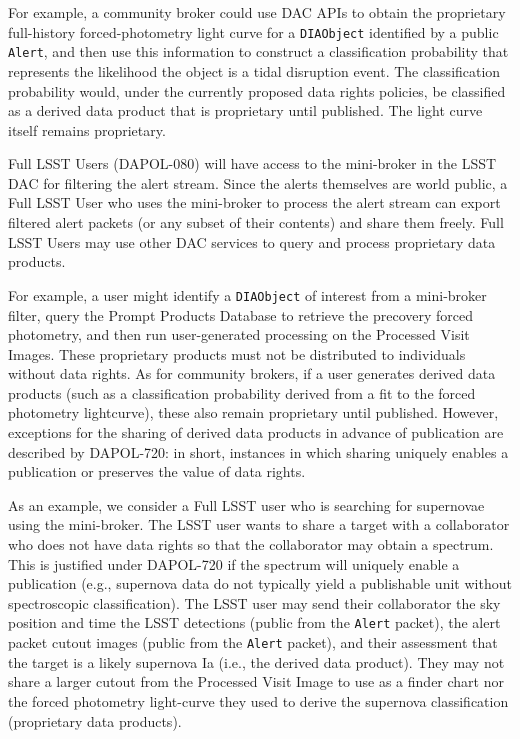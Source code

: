 For example, a community broker could use DAC APIs to obtain the proprietary full-history forced-photometry light curve for a \texttt{DIAObject} identified by a public {\tt Alert}, 
and then use this information to construct a classification probability that represents the likelihood the object is a tidal disruption event.
The classification probability would, under the currently proposed data rights policies, be classified as a derived data product that is proprietary until published. The light curve itself remains proprietary.

Full LSST Users (DAPOL-080) will have access to the mini-broker in the LSST DAC for filtering the alert stream.
Since the alerts themselves are world public, a Full LSST User who uses the mini-broker to process the alert stream can export filtered alert packets (or any subset of their contents) and share them freely.
Full LSST Users may use other DAC services to query and process proprietary data products.

For example, a user might identify a \texttt{DIAObject} of interest from a mini-broker filter, query the Prompt Products Database to retrieve the precovery forced photometry, and then run user-generated processing on the Processed Visit Images.
These proprietary products must not be distributed to individuals without data rights.
As for community brokers, if a user generates derived data products (such as a classification probability derived from a fit to the forced photometry lightcurve), these also remain proprietary until published.
However, exceptions for the sharing of derived data products in advance of publication are described by DAPOL-720: in short, instances in which sharing uniquely enables a publication or preserves the value of data rights.

As an example, we consider a Full LSST user who is searching for supernovae using the mini-broker.
The LSST user wants to share a target with a collaborator who does not have data rights so that the collaborator may obtain a spectrum.
This is justified under DAPOL-720 if the spectrum will uniquely enable a publication (e.g., supernova data do not typically yield a publishable unit without spectroscopic classification).
The LSST user may send their collaborator the sky position and time the LSST detections (public from the \texttt{Alert} packet), the alert packet cutout images (public from the \texttt{Alert} packet), and their assessment that the target is a likely supernova Ia (i.e., the derived data product).
They may not share a larger cutout from the Processed Visit Image to use as a finder chart nor the forced photometry light-curve they used to derive the supernova classification (proprietary data products).
